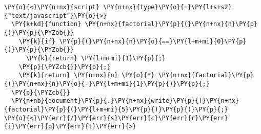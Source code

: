 \begin{Verbatim}[commandchars=\\\{\}]
\PY{o}{<}\PY{n+nx}{script} \PY{n+nx}{type}\PY{o}{=}\PY{l+s+s2}{"text/javascript"}\PY{o}{>}
  \PY{k+kd}{function} \PY{n+nx}{factorial}\PY{p}{(}\PY{n+nx}{n}\PY{p}{)}\PY{p}{\PYZob{}}
    \PY{k}{if} \PY{p}{(}\PY{n+nx}{n}\PY{o}{==}\PY{l+m+mi}{0}\PY{p}{)}\PY{p}{\PYZob{}}
      \PY{k}{return} \PY{l+m+mi}{1}\PY{p}{;}
    \PY{p}{\PYZcb{}}\PY{p}{;}
    \PY{k}{return} \PY{n+nx}{n} \PY{o}{*} \PY{n+nx}{factorial}\PY{p}{(}\PY{n+nx}{n}\PY{o}{-}\PY{l+m+mi}{1}\PY{p}{)}\PY{p}{;}
  \PY{p}{\PYZcb{}}
  \PY{n+nb}{document}\PY{p}{.}\PY{n+nx}{write}\PY{p}{(}\PY{n+nx}{factorial}\PY{p}{(}\PY{l+m+mi}{5}\PY{p}{)}\PY{p}{)}\PY{p}{;}
\PY{o}{<}\PY{err}{/}\PY{err}{s}\PY{err}{c}\PY{err}{r}\PY{err}{i}\PY{err}{p}\PY{err}{t}\PY{err}{>}
\end{Verbatim}
